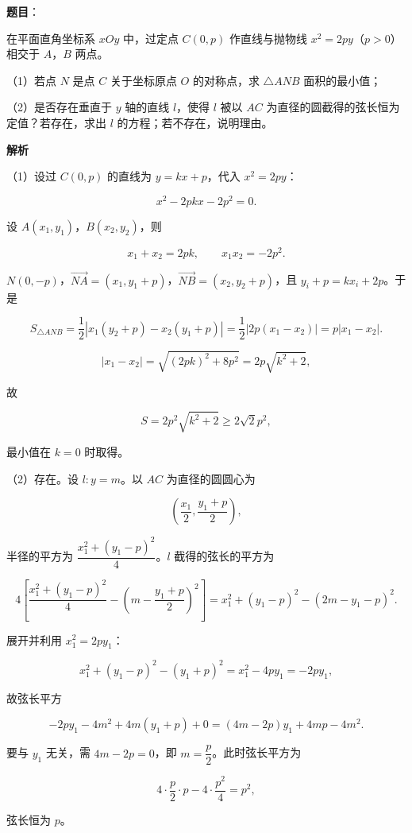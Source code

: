 \begin{answer}

\textbf{题目}：

在平面直角坐标系 $xOy$ 中，过定点 $C(0,p)$ 作直线与抛物线 $x^2=2py$（$p>0$）相交于 $A$，$B$ 两点。

（1）若点 $N$ 是点 $C$ 关于坐标原点 $O$ 的对称点，求 $\triangle ANB$ 面积的最小值；

（2）是否存在垂直于 $y$ 轴的直线 $l$，使得 $l$ 被以 $AC$ 为直径的圆截得的弦长恒为定值？若存在，求出 $l$ 的方程；若不存在，说明理由。
\nopagebreak[4]
\begin{center}\end{center}
\nopagebreak[4]
\textbf{解析}

（1）设过 $C(0,p)$ 的直线为 $y=kx+p$，代入 $x^2=2py$：

\nopagebreak[4]
\[x^2-2pkx-2p^2=0.\]

设 $A(x_1,y_1)$，$B(x_2,y_2)$，则

\nopagebreak[4]
\[x_1+x_2=2pk,\qquad x_1x_2=-2p^2.\]

$N(0,-p)$，$\overrightarrow{NA}=(x_1,y_1+p)$，$\overrightarrow{NB}=(x_2,y_2+p)$，且 $y_i+p=kx_i+2p$。于是

\nopagebreak[4]
\[S_{\triangle ANB}=\frac12\left|x_1(y_2+p)-x_2(y_1+p)\right|
=\frac12\left|2p(x_1-x_2)\right|=p|x_1-x_2|.\]

\nopagebreak[4]
\[|x_1-x_2|=\sqrt{(2pk)^2+8p^2}=2p\sqrt{k^2+2},\]

故

\nopagebreak[4]
\[S=2p^2\sqrt{k^2+2}\geqslant2\sqrt2p^2,\]

最小值在 $k=0$ 时取得。

（2）存在。设 $l:y=m$。以 $AC$ 为直径的圆圆心为

\nopagebreak[4]
\[\left(\frac{x_1}2,\frac{y_1+p}2\right),\]

半径的平方为 $\dfrac{x_1^2+(y_1-p)^2}4$。$l$ 截得的弦长的平方为

\nopagebreak[4]
\[4\left[\frac{x_1^2+(y_1-p)^2}4-\left(m-\frac{y_1+p}2\right)^2\right]
=x_1^2+(y_1-p)^2-(2m-y_1-p)^2.\]

展开并利用 $x_1^2=2py_1$：

\nopagebreak[4]
\[x_1^2+(y_1-p)^2-(y_1+p)^2=x_1^2-4py_1=-2py_1,\]

故弦长平方

\nopagebreak[4]
\[-2py_1-4m^2+4m(y_1+p)+0=(4m-2p)y_1+4mp-4m^2.\]

要与 $y_1$ 无关，需 $4m-2p=0$，即 $m=\dfrac p2$。此时弦长平方为

\nopagebreak[4]
\[4\cdot\frac p2\cdot p-4\cdot\frac{p^2}4=p^2,\]

弦长恒为 $p$。


\end{answer}
